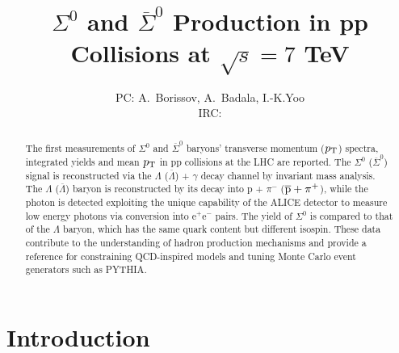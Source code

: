 \documentclass[ALICE,manyauthors]{cernphprep}
\begin{document}
%

%
\begin{titlepage}
%

\PHdate{\today}  %


\title{$\Sigma^{0}$ and $\overline{\Sigma}^{0}$ Production in pp Collisions at $\sqrt{s} = 7$ TeV }


\author{PC: A.~Borissov,  A.~Badala, I.-K.Yoo \\
IRC:} 



\begin{abstract}
The first measurements of $\Sigma^{0}$ and $\overline{\Sigma}^{0}$ baryons'
transverse momentum ($p_{\rm{T}}$) spectra, integrated yields and mean $p_{\rm T}$ 
in pp collisions at the LHC are reported. The $\Sigma^{0}$ 
($\overline{\Sigma}^{0}$) signal is reconstructed via the $\Lambda$
($\overline{\Lambda}$) + $\gamma$ decay channel by invariant mass analysis.
The $\Lambda$ ($\overline{\Lambda}$) baryon is reconstructed by its decay
into p + $\pi^{-}$ ($\overline{ \rm{p}} + \pi^{+}$), while the photon is detected
exploiting the unique capability of the ALICE detector to measure low energy
photons via conversion into e$^{+}$e$^{-}$ pairs.
The yield of $\Sigma^{0}$ is compared to that of the
$\Lambda$ baryon, which has the same quark content but different
isospin. These data contribute to the understanding of hadron production
mechanisms and provide a reference for constraining QCD-inspired models and
tuning Monte Carlo event generators such as PYTHIA. \\

\end{abstract}

\end{titlepage}
\setcounter{page}{2}

 \tableofcontents  

\newpage

 \section{Introduction}
 \label{sec:intro}
\end{document}
